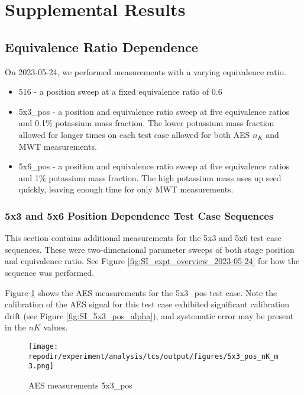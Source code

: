 \section{Supplemental Results}

\subsection{Equivalence Ratio Dependence}

On 2023-05-24, we performed measurements with a varying equivalence ratio. 

\begin{itemize}
    \item 516 - a position sweep at a fixed equivalence ratio of 0.6
    \item 5x3\_pos - a position and equivalence ratio sweep at five equivalence ratios and 0.1\% potassium mass fraction. The lower potassium mass fraction allowed for longer times on each test case allowed for both AES $n_{K}$ and MWT measurements. 
    \item 5x6\_pos - a position and equivalence ratio sweep at five equivalence ratios and 1\% potassium mass fraction. The high potassium mass uses up seed quickly, leaving enough time for only MWT measurements. 
\end{itemize}
 
\subsubsection{5x3 and 5x6 Position Dependence Test Case Sequences}

This section contains additional measurements for the 5x3 and 5x6 test case sequences. These were two-dimensional parameter sweeps of both stage position and equivalence ratio. See Figure \ref{fig:SI_expt_overview_2023-05-24} for how the sequence was performed. 

Figure \ref{fig:SI_5x3_pos_nK_m3} shows the AES measurements for the 5x3\_pos test case. Note the calibration of the AES signal for this test case exhibited significant calibration drift (see Figure \ref{fig:SI_5x3_pos_alpha}), and systematic error may be present in the $nK$ values. 


\begin{figure}[]
\centering
\texttt{[image: \\repodir/experiment/analysis/tcs/output/figures/5x3\_pos\_nK\_m3.png]}
\caption{AES measurements 5x3\_pos}
\label{fig:SI_5x3_pos_nK_m3}
\end{figure}

